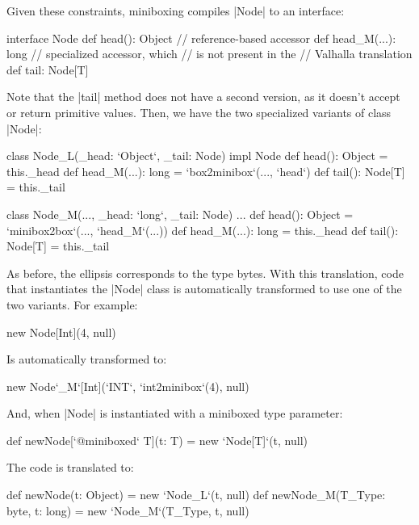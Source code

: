 Given these constraints, miniboxing compiles |Node| to an interface:

\begin{lstlisting-nobreak}
 interface Node {
   def head(): Object           // reference-based accessor
   def head_M(...): long // specialized accessor, which
                                // is not present in the
                                // Valhalla translation
   def tail: Node[T]
 }
\end{lstlisting-nobreak}

Note that the |tail| method does not have a second version, as it doesn't accept or return primitive values. Then, we have the two specialized variants of class |Node|:

\begin{lstlisting-nobreak}
 class Node_L(_head: `Object`, _tail: Node) impl Node {
   def head(): Object = this._head
   def head_M(...): long = `box2minibox`(..., `head`)
   def tail(): Node[T] = this._tail
 }

 class Node_M(..., _head: `long`, _tail: Node) ... {
   def head(): Object = `minibox2box`(..., `head_M`(...))
   def head_M(...): long = this._head
   def tail(): Node[T] = this._tail
 }
\end{lstlisting-nobreak}

As before, the ellipsis corresponds to the type bytes. With this translation, code that instantiates the |Node| class is automatically transformed to use one of the two variants. For example:

\begin{lstlisting-nobreak}
 new Node[Int](4, null)
\end{lstlisting-nobreak}

Is automatically transformed to:

\begin{lstlisting-nobreak}
 new Node`_M`[Int](`INT`, `int2minibox`(4), null)
\end{lstlisting-nobreak}

And, when |Node| is instantiated with a miniboxed type parameter:

\begin{lstlisting-nobreak}
 def newNode[`@miniboxed` T](t: T) =
   new `Node[T]`(t, null)
\end{lstlisting-nobreak}

The code is translated to:

\begin{lstlisting-nobreak}
 def newNode(t: Object) =
   new `Node_L`(t, null)
 def newNode_M(T_Type: byte, t: long) =
   new `Node_M`(T_Type, t, null)
\end{lstlisting-nobreak}

